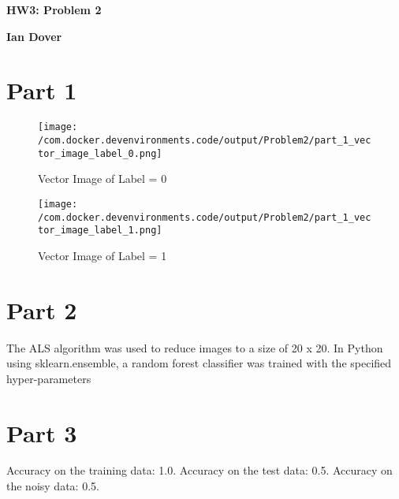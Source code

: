 \documentclass{article}%
\begin{document}
%
\normalsize%
\pagestyle{header}%
\begin{minipage}{\textwidth}%
\centering%
\begin{Large}%
\textbf{HW3: Problem 2}%
\end{Large}%
\linebreak%
\begin{large}%
\textbf{Ian Dover}%
\end{large}%
\end{minipage}%
\section{Part 1}%
\label{sec:Part1}%


\begin{figure}[h!]%
\centering%
\texttt{[image: /com.docker.devenvironments.code/output/Problem2/part\_1\_vector\_image\_label\_0.png]}%
\caption{Vector Image of Label = 0}%
\end{figure}

%


\begin{figure}[h!]%
\centering%
\texttt{[image: /com.docker.devenvironments.code/output/Problem2/part\_1\_vector\_image\_label\_1.png]}%
\caption{Vector Image of Label = 1}%
\end{figure}

%
\section{Part 2}%
\label{sec:Part2}%
The ALS algorithm was used to reduce images to a size of 20 x 20. In Python using sklearn.ensemble,\newline%
    a random forest classifier was trained with the specified hyper{-}parameters

%
\section{Part 3}%
\label{sec:Part3}%
Accuracy on the training data: 1.0.\newline%
%
Accuracy on the test data: 0.5.\newline%
%
Accuracy on the noisy data: 0.5.\newline%

%
\end{document}
